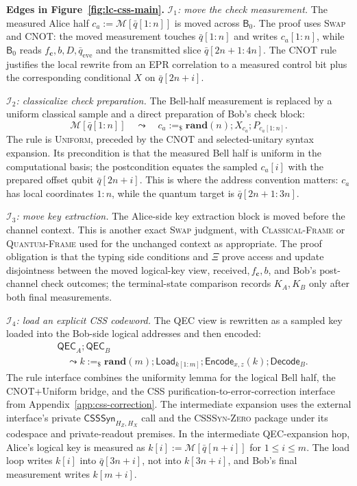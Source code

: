 \documentclass[conference,compsoc]{IEEEtran}
\begin{document}
\smallskip\noindent\textbf{Edges in Figure~\ref{fig:lc-css-main}.}
\emph{\(\mathcal I_1\): move the check measurement.}
The measured Alice half \(c_a:=\mathcal M[\bar q[1{:}n]]\) is moved across \(\mathsf{B}_0\). The proof uses \textsc{Swap} and \textsc{CNOT}: the moved measurement touches \(\bar q[1{:}n]\) and writes \(c_a[1{:}n]\), while \(\mathsf{B}_0\) reads \(f_{\mathbf c},b,D,\bar q_{\mathrm{eve}}\) and the transmitted slice \(\bar q[2n+1{:}4n]\). The \textsc{CNOT} rule justifies the local rewrite from an EPR correlation to a measured control bit plus the corresponding conditional \(X\) on \(\bar q[2n+i]\).

\emph{\(\mathcal I_2\): classicalize check preparation.}
The Bell-half measurement is replaced by a uniform classical sample and a direct preparation of Bob's check block:
\[
\mathcal M[\bar q[1{:}n]]
\quad\leadsto\quad
c_a:=_\$\mathbf{rand}(n);
X_{c_a};
P_{c_a[1{:}n]} .
\]
The rule is \textsc{Uniform}, preceded by the CNOT and selected-unitary syntax expansion. Its precondition is that the measured Bell half is uniform in the computational basis; the postcondition equates the sampled \(c_a[i]\) with the prepared offset qubit \(\bar q[2n+i]\). This is where the address convention matters: \(c_a\) has local coordinates \(1{:}n\), while the quantum target is \(\bar q[2n+1{:}3n]\).

\emph{\(\mathcal I_3\): move key extraction.}
The Alice-side key extraction block is moved before the channel context. This is another exact \textsc{Swap} judgment, with \textsc{Classical-Frame} or \textsc{Quantum-Frame} used for the unchanged context as appropriate. The proof obligation is that the typing side conditions and \(\Xi\) prove access and update disjointness between the moved logical-key view, \(\mathrm{received},f_{\mathbf c},b\), and Bob's post-channel check outcomes; the terminal-state comparison records \(K_A,K_B\) only after both final measurements.

\emph{\(\mathcal I_4\): load an explicit CSS codeword.}
The QEC view is rewritten as a sampled key loaded into the Bob-side logical addresses and then encoded:
\[
\begin{aligned}
&\mathsf{QEC}_A;\mathsf{QEC}_B\\
&\quad\leadsto
k:=_\$\mathbf{rand}(m);
\mathsf{Load}_{k[1{:}m]};
\mathsf{Encode}_{x,z}(k);
\mathsf{Decode}_B .
\end{aligned}
\]
The rule interface combines the uniformity lemma for the logical Bell half, the
CNOT+Uniform bridge, and the CSS purification-to-error-correction interface
from Appendix~\ref{app:css-correction}. The intermediate expansion uses the
external interface's private \(\mathsf{CSSSyn}_{H_Z,H_X}\) call and the
\textsc{CSSSyn-Zero} package under its codespace and private-readout premises.
In the intermediate QEC-expansion hop, Alice's logical key is measured as
\(k[i]:=\mathcal M[\bar q[n+i]]\) for \(1\le i\le m\). The load loop writes
\(k[i]\) into \(\bar q[3n+i]\), not into \(k[3n+i]\), and Bob's final
measurement writes \(k[m+i]\).
\end{document}
